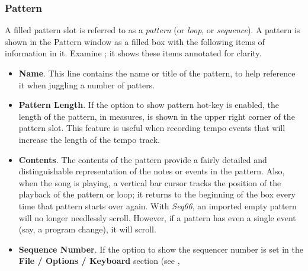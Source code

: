\subsubsection{Pattern}
\label{subsubsec:patterns_pattern_filled}

   A filled pattern slot is referred to as a \textsl{pattern}
   (or \textsl{loop}, or \textsl{sequence}).
   A pattern is shown in the Pattern window as a filled box with the
   following items of information in it.
   Examine ; it shows
   these items annotated for clarity.

   \begin{itemize}
      \item \textbf{Name}.
         This line contains the name or title of the pattern, to help
         reference it when juggling a number of patters.
      \item \textbf{Pattern Length}.
         If the option to show pattern hot-key is enabled, the length of the
         pattern, in measures, is shown in the upper right corner of the
         pattern slot.  This feature is useful when recording tempo events that
         will increase the length of the tempo track.
      \item \textbf{Contents}.
         The contents of the pattern provide a fairly detailed and
         distinguishable representation of the notes or events in the
         pattern.  Also, when the song is playing, a vertical bar cursor
         tracks the position of the playback of the pattern or loop; it
         returns to the beginning of the box every time that pattern starts
         over again.
         With \textsl{Seq66}, an imported empty pattern will no longer
         needlessly scroll.
         However, if a pattern has even a single event (say, a program change),
         it will scroll.
      \item \textbf{Sequence Number}.
         If the option to show the sequencer number is set
         in the \textbf{File / Options / Keyboard} section
         (see ,

\end{itemize}
